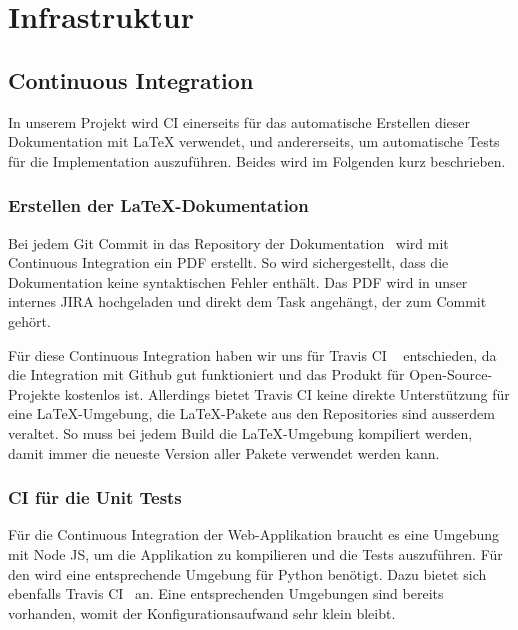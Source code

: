 
\section{Infrastruktur}
\label{Infrastruktur}

\subsection{Continuous Integration}
\label{Infrastruktur:Continuous Integration}

In unserem Projekt wird \ac{CI} einerseits für das automatische Erstellen dieser Dokumentation mit LaTeX verwendet, und andererseits, um automatische Tests für die Implementation auszuführen.
Beides wird im Folgenden kurz beschrieben.

\subsubsection{Erstellen der LaTeX-Dokumentation}
\label{CI:Erstellen der LaTeX-Dokumentation}

Bei jedem Git Commit in das Repository der Dokumentation~\cite{github:thesis} wird mit Continuous Integration ein PDF erstellt.
So wird sichergestellt, dass die Dokumentation keine syntaktischen Fehler enthält.
Das PDF wird in unser internes JIRA hochgeladen und direkt dem Task angehängt, der zum Commit gehört.

Für diese Continuous Integration haben wir uns für Travis CI ~\cite{travis-ci} entschieden, da die Integration mit Github gut funktioniert und das Produkt für Open-Source-Projekte kostenlos ist.
Allerdings bietet Travis CI keine direkte Unterstützung für eine LaTeX-Umgebung, die LaTeX-Pakete aus den Repositories sind ausserdem veraltet.
So muss bei jedem Build die LaTeX-Umgebung kompiliert werden, damit immer die neueste Version aller Pakete verwendet werden kann.


\subsubsection{CI für die Unit Tests}
\label{CI:CI für Backend}

Für die Continuous Integration der Web-Applikation braucht es eine Umgebung mit Node JS, um die Applikation zu kompilieren und die Tests auszuführen.
Für den  wird eine entsprechende Umgebung für Python benötigt.
Dazu bietet sich ebenfalls Travis CI~\cite{travis-ci} an.
Eine entsprechenden Umgebungen sind bereits vorhanden, womit der Konfigurationsaufwand sehr klein bleibt.


